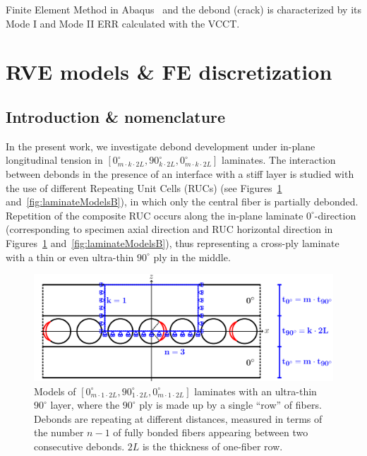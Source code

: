 \documentclass[Review,sagev,times]{sagej}
\begin{document}
Finite Element Method in Abaqus~\cite{abq12} and the debond (crack) is characterized by its Mode I and Mode II ERR calculated with the VCCT.


\section{RVE models \& FE discretization}


\subsection{Introduction \& nomenclature}\label{subsec:names}

In the present work, we investigate debond development under in-plane longitudinal tension in $\left[0_{m\cdot k\cdot2L}^{\circ},90_{k\cdot2L}^{\circ},0_{m\cdot k\cdot2L}^{\circ}\right]$ laminates. The interaction between debonds in the presence of an interface with a stiff layer is studied with the use of different Repeating Unit Cells (RUCs)  (see Figures~\ref{fig:laminateModelsA} and~\ref{fig:laminateModelsB}), in which only the central fiber is partially debonded. Repetition of the composite RUC occurs along the in-plane laminate $0^{\circ}$-direction (corresponding to specimen axial direction and RUC horizontal direction in Figures~\ref{fig:laminateModelsA} and~\ref{fig:laminateModelsB}), thus representing a cross-ply laminate with a thin or even ultra-thin $90^{\circ}$ ply in the middle.\\

\begin{figure}[!htb]
\centering
  \includegraphics[height=0.225\textheight]{thinPly.pdf}
\caption{Models of $\left[0_{m\cdot 1\cdot2L}^{\circ},90_{1\cdot2L}^{\circ},0_{m\cdot 1\cdot2L}^{\circ}\right]$ laminates with an ultra-thin $90^{\circ}$ layer, where the $90^{\circ}$ ply is made up by a single ``row'' of fibers. Debonds are repeating at different distances, measured in terms of the number $n-1$ of fully bonded fibers appearing between two consecutive debonds. $2L$ is the thickness of one-fiber row.}\label{fig:laminateModelsA}
\end{figure}
\end{document}
